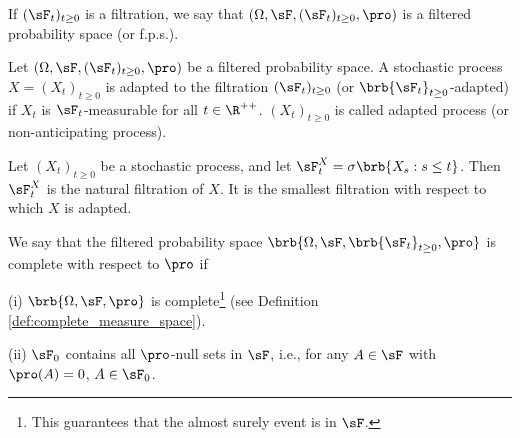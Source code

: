 
\begin{definition}
If $(\sF_t)_{t\geq 0}$ is a filtration, we say that $(\Omega,\sF, (\sF_t)_{t\geq 0},\pro)$ is a filtered probability space (or f.p.s.).
\end{definition}

\begin{definition}\label{def:adapted_process_continuous}
Let $(\Omega,\sF, (\sF_t)_{t\geq 0},\pro)$ be a filtered probability space. A stochastic process $X = (X_t)_{t\geq 0}$ is adapted to the filtration $(\sF_t)_{t\geq 0}$ (or $\brb{\sF_t}_{t\geq 0}$-adapted) if $X_t$ is $\sF_t$-measurable for all $t\in \R^{++}$. $(X_t)_{t\geq 0}$ is called adapted process (or non-anticipating process).
\end{definition}




\begin{definition}
Let $(X_t)_{t\geq 0}$ be a stochastic process, and let $\sF^X_t = \sigma\brb{X_s: s \leq t}$. Then $\sF^X_t$ is the natural filtration of $X$. It is the smallest filtration with respect to which $X$ is adapted.
\end{definition}



\begin{definition}\label{def:complete_filtered_probability_space}%
We say that the filtered probability space $\brb{\Omega,\sF,\brb{\sF_t}_{t\geq 0},\pro}$ is complete with respect to $\pro$ if
\ben
\item [(i)] $\brb{\Omega,\sF,\pro}$ is complete\footnote{This guarantees that the almost surely event is in $\sF$.} (see Definition \ref{def:complete_measure_space}).
\item [(ii)] $\sF_0$ contains all $\pro$-null sets in $\sF$, i.e., for any $A\in \sF$ with $\pro(A)=0$, $A\in \sF_0$.	
\een%
\end{definition}


